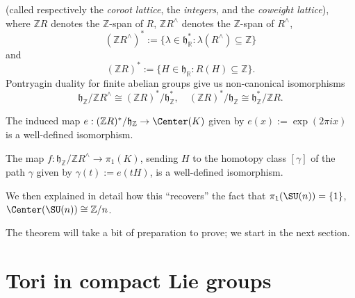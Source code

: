 \documentclass[reqno]{amsart} 
\begin{document}
(called respectively the \emph{coroot lattice}, the \emph{integers}, and the \emph{coweight lattice}), where $\mathbb{Z} R$ denotes the $\mathbb{Z}$-span of $R$, $\mathbb{Z} R^\wedge$ denotes the $\mathbb{Z}$-span of $R^\wedge$,
\begin{equation*}
  (\mathbb{Z} R^\wedge)^* := \{\lambda \in \mathfrak{h}_\mathbb{R}^* : \lambda(R^\wedge) \subseteq \mathbb{Z} \}
\end{equation*}
and
\begin{equation*}
  (\mathbb{Z} R)^* := \{H \in \mathfrak{h}_\mathbb{R} : R(H) \subseteq \mathbb{Z} \}.
\end{equation*}
Pontryagin duality for finite abelian groups give us non-canonical isomorphisms
\begin{equation}
  \mathfrak{h}_\mathbb{Z}/
  \mathbb{Z} R^\wedge
  \cong (\mathbb{Z} R)^* /  \mathfrak{h}_\mathbb{Z}^*,
  \quad
  (\mathbb{Z} R)^*
  / \mathfrak{h}_\mathbb{Z}
  \cong
  \mathfrak{h}_\mathbb{Z}^*
  /
  \mathbb{Z} R.
\end{equation}
\begin{theorem}
  The induced map $e : (\mathbb{Z} R)^* / \mathfrak{h}_\mathbb{Z} \rightarrow \Center(K)$ given by $e(x) := \exp(2 \pi i x)$ is a well-defined isomorphism.

  The map $f : \mathfrak{h}_\mathbb{Z} / \mathbb{Z} R^\wedge \rightarrow \pi_1(K)$, sending $H$ to the homotopy class $[\gamma]$ of the path $\gamma$ given by $\gamma(t) := e(t H)$, is a well-defined isomorphism.
\end{theorem}
We then explained in detail how this ``recovers'' the fact that $\pi_1(\SU(n)) =\{1\}$, $\Center(\SU(n)) \cong \mathbb{Z}/n$.

The theorem will take a bit of preparation to prove; we start in the next section.

\section{Tori in compact Lie groups\label{sec:tori-compact-lie-gps}}
\label{sec:orga4a1522}
\end{document}
